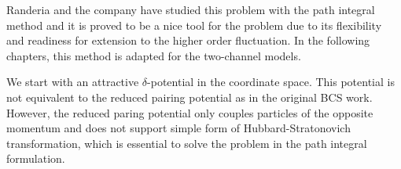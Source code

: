 \label{sec:pathInt}
Randeria and the company have studied this problem with the path integral method and it is proved to be a  nice tool for the problem due to its flexibility and readiness for extension to the higher order fluctuation.  In the following chapters, this method is adapted  for the two-channel models. 

We start with an attractive $\delta$-potential in the coordinate space.  This potential is not equivalent to the  reduced pairing potential as in the original BCS work.  However, the reduced paring potential only couples  particles of the opposite momentum and does not support simple form of Hubbard-Stratonovich transformation, which is essential to solve the problem in the path integral formulation. 

